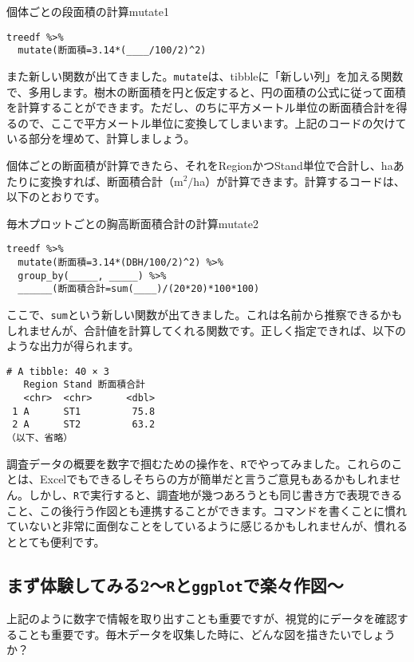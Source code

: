 \begin{exercise}{個体ごとの段面積の計算}{mutate1}
\begin{verbatim}
treedf %>%
  mutate(断面積=3.14*(____/100/2)^2)
\end{verbatim}
\end{exercise}
また新しい関数が出てきました。\verb|mutate|は、tibbleに「新しい列」を加える関数で、多用します。樹木の断面積を円と仮定すると、円の面積の公式に従って面積を計算することができます。ただし、のちに平方メートル単位の断面積合計を得るので、ここで平方メートル単位に変換してしまいます。上記のコードの欠けている部分を埋めて、計算しましょう。

個体ごとの断面積が計算できたら、それをRegionかつStand単位で合計し、haあたりに変換すれば、断面積合計（m$^{2}/$ha）が計算できます。計算するコードは、以下のとおりです。

\begin{exercise}{毎木プロットごとの胸高断面積合計の計算}{mutate2}
\begin{verbatim}
treedf %>%
  mutate(断面積=3.14*(DBH/100/2)^2) %>%
  group_by(_____, _____) %>%
  ______(断面積合計=sum(____)/(20*20)*100*100)
\end{verbatim}
\end{exercise}
ここで、\verb|sum|という新しい関数が出てきました。これは名前から推察できるかもしれませんが、合計値を計算してくれる関数です。正しく指定できれば、以下のような出力が得られます。

\begin{verbatim}
# A tibble: 40 × 3
   Region Stand 断面積合計
   <chr>  <chr>      <dbl>
 1 A      ST1         75.8
 2 A      ST2         63.2
（以下、省略）
\end{verbatim}

調査データの概要を数字で掴むための操作を、\texttt{R}でやってみました。これらのことは、Excelでもできるしそちらの方が簡単だと言うご意見もあるかもしれません。しかし、\texttt{R}で実行すると、調査地が幾つあろうとも同じ書き方で表現できること、この後行う作図とも連携することができます。コマンドを書くことに慣れていないと非常に面倒なことをしているように感じるかもしれませんが、慣れるととても便利です。

  \subsection{まず体験してみる2〜\texttt{R}と\texttt{ggplot}で楽々作図〜}
上記のように数字で情報を取り出すことも重要ですが、視覚的にデータを確認することも重要です。毎木データを収集した時に、どんな図を描きたいでしょうか？

